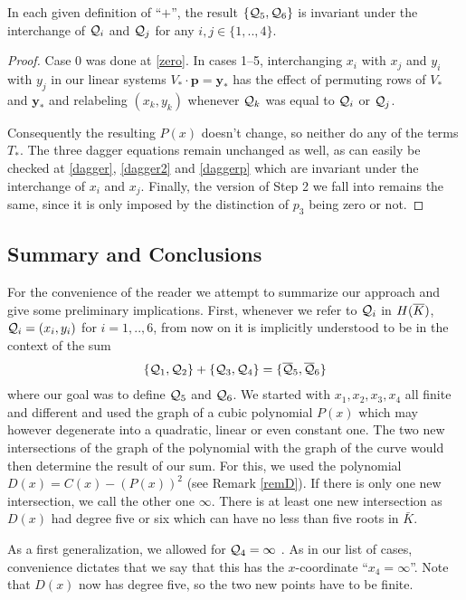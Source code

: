 \documentclass[english,11pt,a4paper]{article}
\begin{document}
\begin{lemma}
In each given definition of ``$+$'', the result $\{ \mathcal{Q}_5, \mathcal{Q}_6 \}$ is invariant under the interchange of $\mathcal{Q}_i$ and $\mathcal{Q}_j$ for any $i,j \in \{ 1,..,4 \}$.

\begin{proof}
  Case 0 was done at \eqref{zero}.
  In cases 1--5, interchanging $x_i$ with $x_j$ and $y_i$ with $y_j$ in our linear systems $V_{\ast} \cdot \mathbf{p} = \mathbf{y}_{\ast}$ has the effect of permuting rows of $V_{\ast}$ and $\mathbf{y}_{\ast}$ and relabeling $(x_k,y_k)$ whenever $\mathcal{Q}_k$ was equal to $\mathcal{Q}_i$ or $\mathcal{Q}_j$.

  Consequently the resulting $P(x)$ doesn't change, so neither do any of the terms $T_{\ast}$. The three dagger equations remain unchanged as well, as can easily be checked at \eqref{dagger}, \eqref{dagger2} and \eqref{daggerp} which are invariant under the interchange of $x_i$ and $x_j$. Finally, the version of Step 2 we fall into remains the same, since it is only imposed by the distinction of $p_3$ being zero or not. 
\end{proof}
\end{lemma}

\subsection{Summary and Conclusions}

For the convenience of the reader we attempt to summarize our approach and give some preliminary implications. First, whenever we refer to $\mathcal{Q}_i$ in $H(\overline K)$, $\mathcal{Q}_i = (x_i, y_i)$ for $i = 1,..,6$, from now on it is implicitly understood to be in the context of the sum
\begin{align*}
  \{\mathcal{Q}_1, \mathcal{Q}_2 \} +\{ \mathcal{Q}_3 , \mathcal{Q}_4 \} = \{\overline {\mathcal{Q}}_5 , \overline {\mathcal{Q}}_6\}
\end{align*}
where our goal was to define $\mathcal{Q}_5$ and $\mathcal{Q}_6$. We started with $x_1, x_2, x_3, x_4$ all finite and different and used the graph of a cubic polynomial $P(x)$ which may however degenerate into a quadratic, linear or even constant one. The two new intersections of the graph of the polynomial with the graph of the curve would then determine the result of our sum. For this, we used the polynomial $D(x)=C(x)-(P(x))^2$ (see Remark \ref{remD}). If there is only one new intersection, we call the other one $\infty$. There is at least one new intersection as $D(x)$ had degree five or six which can have no less than five roots in $\bar K$.

As a first generalization, we allowed for $\mathcal{Q}_4 = \infty$ . As in our list of cases, convenience dictates that we say that this has the $x$-coordinate ``$x_4 = \infty$''. Note that $D(x)$ now has degree five, so the two new points have to be finite.
\end{document}
